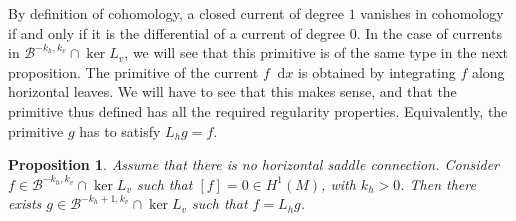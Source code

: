 \documentclass[10pt]{amsart}
\newcommand{\boB}{\mathcal{B}}
\newcommand{\dd}{\mathop{}\!\mathrm{d}}
\newtheorem{prop}[thm]{Proposition}
\theoremstyle{definition}
\numberwithin{equation}{section}
\begin{document}
By definition of cohomology, a closed current of degree $1$ vanishes in
cohomology if and only if it is the differential of a current of degree $0$.
In the case of currents in $\boB^{-k_h, k_v} \cap \ker L_v$, we will see that
this primitive is of the same type in the next proposition. The primitive of
the current $f \dd x$ is obtained by integrating $f$ along horizontal leaves.
We will have to see that this makes sense, and that the primitive thus
defined has all the required regularity properties. Equivalently, the
primitive $g$ has to satisfy $L_h g = f$.

\begin{prop}
\label{prop:integre_Lu} Assume that there is no horizontal saddle connection.
Consider $f \in \boB^{-k_h, k_v} \cap \ker L_v$ such that $[f] = 0 \in
H^1(M)$, with $k_h>0$. Then there exists $g \in \boB^{-k_h+1, k_v} \cap \ker
L_v$ such that $f = L_h g$.
\end{prop}
\end{document}
